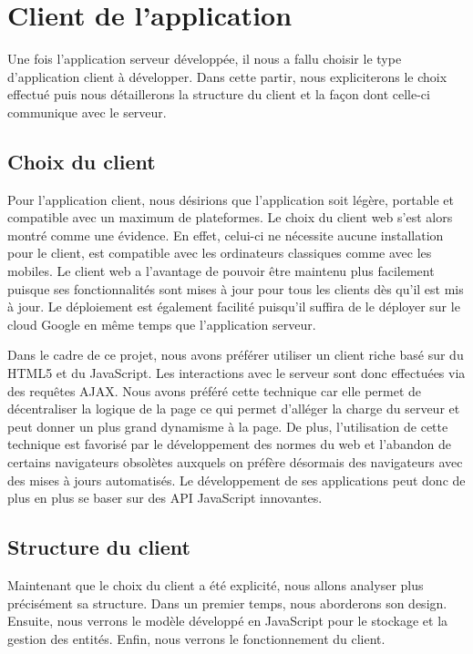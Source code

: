 \chapter{Client de l'application}
Une fois l'application serveur développée, il nous a fallu choisir le type d'application client à développer. Dans cette partir, nous expliciterons le choix effectué puis nous détaillerons la structure du client et la façon dont celle-ci communique avec le serveur.


\section{Choix du client}
Pour l'application client, nous désirions que l'application soit légère, portable et compatible avec un maximum de plateformes. Le choix du client web s'est alors montré comme une évidence. En effet, celui-ci ne nécessite aucune installation pour le client, est compatible avec les ordinateurs classiques comme avec les mobiles. Le client web a l'avantage de pouvoir être maintenu plus facilement puisque ses fonctionnalités sont mises à jour pour tous les clients dès qu'il est mis à jour. Le déploiement est également facilité puisqu'il suffira de le déployer sur le cloud Google en même temps que l'application serveur.

Dans le cadre de ce projet, nous avons préférer utiliser un client riche basé sur du HTML5 et du JavaScript. Les interactions avec le serveur sont donc effectuées via des requêtes AJAX. Nous avons préféré cette technique car elle permet de décentraliser la logique de la page ce qui permet d'alléger la charge du serveur et peut donner un plus grand dynamisme à la page. De plus, l'utilisation de cette technique est favorisé par le développement des normes du web et l'abandon de certains navigateurs obsolètes auxquels on préfère désormais des navigateurs avec des mises à jours automatisés. Le développement de ses applications peut donc de plus en plus se baser sur des API JavaScript innovantes.

\section{Structure du client}
Maintenant que le choix du client a été explicité, nous allons analyser plus précisément sa structure. Dans un premier temps, nous aborderons son design. Ensuite, nous verrons le modèle développé en JavaScript pour le stockage et la gestion des entités. Enfin, nous verrons le fonctionnement du client.

